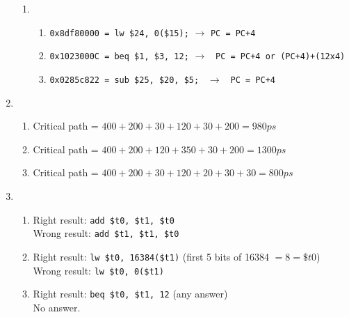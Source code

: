 \documentclass[12pt, a4paper]{article}
\begin{document}
\begin{enumerate}[Q\arabic*.]
\begin{enumerate}[(\alph*.)]
      \item 
        \begin{enumerate}[(\roman*)]
          \item \lstinline|0x8df80000 = lw $24, 0($15);| $\rightarrow$ \lstinline|PC = PC+4|
          \item \lstinline|0x1023000C = beq $1, $3, 12;| $\rightarrow$ \lstinline| PC = PC+4 or (PC+4)+(12x4)|

          \item \lstinline|0x0285c822 = sub $25, $20, $5; | $\rightarrow$ \lstinline| PC = PC+4|
        \end{enumerate}
    \end{enumerate}

  \item 
    \begin{enumerate}[(\alph*.)]
      \item Critical path = $400 + 200 + 30 + 120 + 30 + 200 = 980ps$

      \item Critical path = $400 + 200 + 120 + 350 + 30 + 200 = 1300ps$

      \item Critical path = $400 + 200 + 30 + 120 + 20 + 30 + 30 = 800ps$
    \end{enumerate}

  \item 
    \begin{enumerate}[(\alph*.)]
      \item Right result: \lstinline|add $t0, $t1, $t0|\\
        Wrong result: \lstinline|add $t1, $t1, $t0|

      \item Right result: \lstinline|lw $t0, 16384($t1)| (first 5 bits of 16384 $=8=\$t0$)\\
        Wrong result: \lstinline|lw $t0, 0($t1)|

      \item Right result: \lstinline|beq $t0, $t1, 12| (any answer)\\
        No answer.
    \end{enumerate}
\end{enumerate}
\end{document}
